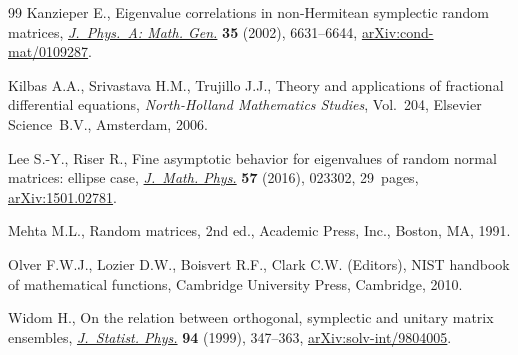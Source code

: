 \documentclass[11pt]{article}
\numberwithin{equation}{section}
\numberwithin{equation}{section}
\newcommand{\1}{\chi}
\begin{document}
\begin{thebibliography}{99}
Kanzieper E., Eigenvalue correlations in non-{H}ermitean symplectic random
 matrices, \href{https://doi.org/10.1088/0305-4470/35/31/308}{\textit{J.~Phys.~A: Math. Gen.}} \textbf{35} (2002), 6631--6644,
 \href{https://arxiv.org/abs/cond-mat/0109287}{arXiv:cond-mat/0109287}.

Kilbas A.A., Srivastava H.M., Trujillo J.J., Theory and applications of
 fractional differential equations, \textit{North-Holland Mathematics
 Studies}, Vol.~204, Elsevier Science~B.V., Amsterdam, 2006.

Lee S.-Y., Riser R., Fine asymptotic behavior for eigenvalues of random normal
 matrices: ellipse case, \href{https://doi.org/10.1063/1.4939973}{\textit{J.~Math. Phys.}} \textbf{57} (2016), 023302,
 29~pages, \href{https://arxiv.org/abs/1501.02781}{arXiv:1501.02781}.

Mehta M.L., Random matrices, 2nd ed., Academic Press, Inc., Boston, MA, 1991.

Olver F.W.J., Lozier D.W., Boisvert R.F., Clark C.W. (Editors), N{IST} handbook
 of mathematical functions, Cambridge University Press, Cambridge, 2010.

Widom H., On the relation between orthogonal, symplectic and unitary matrix
 ensembles, \href{https://doi.org/10.1023/A:1004516918143}{\textit{J.~Statist. Phys.}} \textbf{94} (1999), 347--363,
 \href{https://arxiv.org/abs/solv-int/9804005}{arXiv:solv-int/9804005}.

\end{thebibliography}
\end{document}
